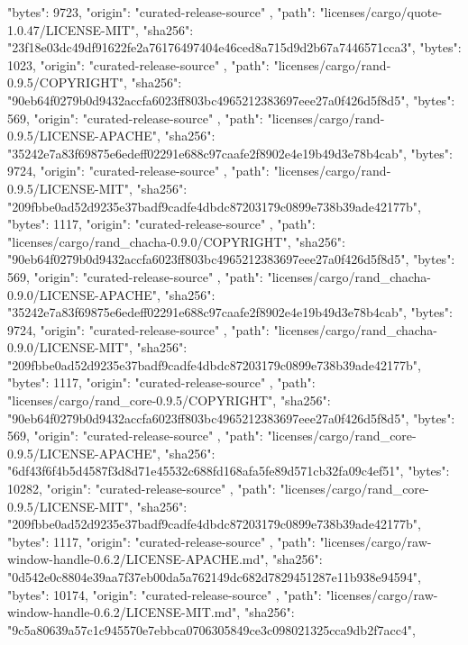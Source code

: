 {{      "bytes": 9723,
      "origin": "curated-release-source"
    },
    {
      "path": "licenses/cargo/quote-1.0.47/LICENSE-MIT",
      "sha256": "23f18e03dc49df91622fe2a76176497404e46ced8a715d9d2b67a7446571cca3",
      "bytes": 1023,
      "origin": "curated-release-source"
    },
    {
      "path": "licenses/cargo/rand-0.9.5/COPYRIGHT",
      "sha256": "90eb64f0279b0d9432accfa6023ff803bc4965212383697eee27a0f426d5f8d5",
      "bytes": 569,
      "origin": "curated-release-source"
    },
    {
      "path": "licenses/cargo/rand-0.9.5/LICENSE-APACHE",
      "sha256": "35242e7a83f69875e6edeff02291e688c97caafe2f8902e4e19b49d3e78b4cab",
      "bytes": 9724,
      "origin": "curated-release-source"
    },
    {
      "path": "licenses/cargo/rand-0.9.5/LICENSE-MIT",
      "sha256": "209fbbe0ad52d9235e37badf9cadfe4dbdc87203179c0899e738b39ade42177b",
      "bytes": 1117,
      "origin": "curated-release-source"
    },
    {
      "path": "licenses/cargo/rand_chacha-0.9.0/COPYRIGHT",
      "sha256": "90eb64f0279b0d9432accfa6023ff803bc4965212383697eee27a0f426d5f8d5",
      "bytes": 569,
      "origin": "curated-release-source"
    },
    {
      "path": "licenses/cargo/rand_chacha-0.9.0/LICENSE-APACHE",
      "sha256": "35242e7a83f69875e6edeff02291e688c97caafe2f8902e4e19b49d3e78b4cab",
      "bytes": 9724,
      "origin": "curated-release-source"
    },
    {
      "path": "licenses/cargo/rand_chacha-0.9.0/LICENSE-MIT",
      "sha256": "209fbbe0ad52d9235e37badf9cadfe4dbdc87203179c0899e738b39ade42177b",
      "bytes": 1117,
      "origin": "curated-release-source"
    },
    {
      "path": "licenses/cargo/rand_core-0.9.5/COPYRIGHT",
      "sha256": "90eb64f0279b0d9432accfa6023ff803bc4965212383697eee27a0f426d5f8d5",
      "bytes": 569,
      "origin": "curated-release-source"
    },
    {
      "path": "licenses/cargo/rand_core-0.9.5/LICENSE-APACHE",
      "sha256": "6df43f6f4b5d4587f3d8d71e45532c688fd168afa5fe89d571cb32fa09c4ef51",
      "bytes": 10282,
      "origin": "curated-release-source"
    },
    {
      "path": "licenses/cargo/rand_core-0.9.5/LICENSE-MIT",
      "sha256": "209fbbe0ad52d9235e37badf9cadfe4dbdc87203179c0899e738b39ade42177b",
      "bytes": 1117,
      "origin": "curated-release-source"
    },
    {
      "path": "licenses/cargo/raw-window-handle-0.6.2/LICENSE-APACHE.md",
      "sha256": "0d542e0c8804e39aa7f37eb00da5a762149dc682d7829451287e11b938e94594",
      "bytes": 10174,
      "origin": "curated-release-source"
    },
    {
      "path": "licenses/cargo/raw-window-handle-0.6.2/LICENSE-MIT.md",
      "sha256": "9c5a80639a57c1c945570e7ebbca0706305849ce3c098021325cca9db2f7acc4",
}}
